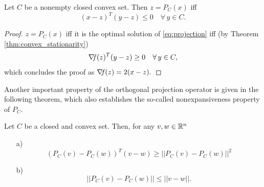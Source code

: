 \documentclass[10pt,a4paper]{article}
\begin{document}
\begin{theorem}\label{thm:second_projection}
	Let $C$ be a nonempty closed convex set. Then $z=P_C(x)$ iff 
	\begin{equation}\label{eq:second_projection}
		(x-z)^T(y-z) \leq 0\quad \forall \,y\in C.
	\end{equation}
\end{theorem}
\begin{proof}
	$z=P_C(x)$ iff it is the optimal solution of \eqref{eq:projection} iff (by Theorem \ref{thm:convex_stationarity})
	\begin{equation*}
		\operatorname*{\mathit{\nabla \!f}}(z)^T(y-z)\geq 0 \quad \forall\,y\in C,
	\end{equation*}
which concludes the proof as $\operatorname*{\mathit{\nabla \!f}}(z) = 2(x-z).$
\end{proof}
Another important property of the orthogonal projection operator is given in the
following theorem, which also establishes the so-called nonexpansiveness property of $P_C$.
\begin{theorem}
	Let $C$ be a closed and convex set. Then, for any $v,w\in \mathbb{R}^n$
	\begin{itemize}
		\item[a)] 
		\begin{equation}\label{eq:nonexpansiveness_1}
			(P_C(v)-P_C(w))^T(v-w)\geq ||P_C(v)-P_C(w)||^2
		\end{equation}
		\item[b)]
		\begin{equation}\label{eq:nonexpansiveness_2}
			 ||P_C(v)-P_C(w)||\leq ||v-w||.
		\end{equation}
	\end{itemize}
\end{theorem}
\end{document}

